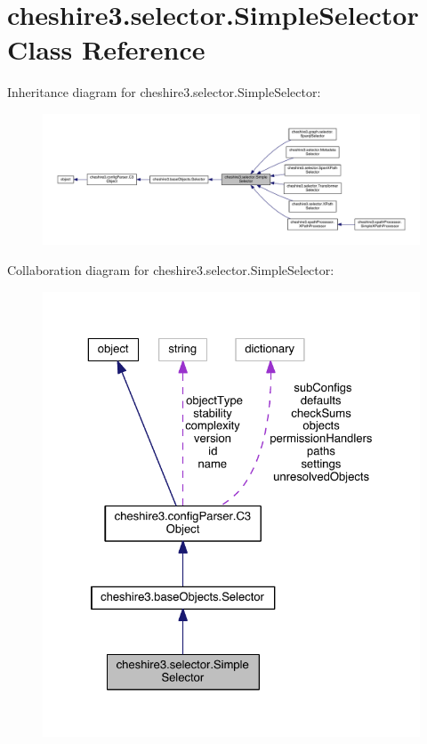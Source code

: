 \hypertarget{classcheshire3_1_1selector_1_1_simple_selector}{\section{cheshire3.\-selector.\-Simple\-Selector Class Reference}
\label{classcheshire3_1_1selector_1_1_simple_selector}
}


Inheritance diagram for cheshire3.\-selector.\-Simple\-Selector\-:
\nopagebreak
\begin{figure}[H]
\begin{center}
\leavevmode
\includegraphics[width=350pt]{classcheshire3_1_1selector_1_1_simple_selector__inherit__graph}
\end{center}
\end{figure}


Collaboration diagram for cheshire3.\-selector.\-Simple\-Selector\-:
\nopagebreak
\begin{figure}[H]
\begin{center}
\leavevmode
\includegraphics[width=325pt]{classcheshire3_1_1selector_1_1_simple_selector__coll__graph}
\end{center}
\end{figure}

